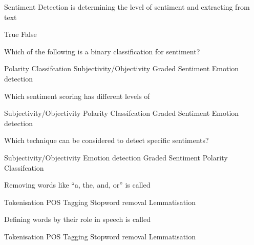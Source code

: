 \documentclass[theme=sleek, randomorder, hidesidemenu]{webquiz}
\begin{document}
\begin{question}
  Sentiment Detection is determining the level of sentiment and extracting from text
  \begin{choice}
    \incorrect True
    \correct False
  \end{choice}
\end{question}

\begin{question}
  Which of the following is a binary classification for sentiment?
  \begin{choice}
    \incorrect Polarity Classifcation
    \correct Subjectivity/Objectivity
    \incorrect Graded Sentiment
    \incorrect Emotion detection
  \end{choice}
\end{question}

\begin{question}
  Which sentiment scoring has different levels of
  \begin{choice}
    \incorrect Subjectivity/Objectivity
    \correct Polarity Classifcation
    \incorrect Graded Sentiment
    \incorrect Emotion detection
  \end{choice}
\end{question}

\begin{question}
  Which technique can be considered to detect specific sentiments?
  \begin{choice}
    \incorrect Subjectivity/Objectivity
    \correct Emotion detection
    \incorrect Graded Sentiment
    \incorrect Polarity Classifcation
  \end{choice}

\end{question}

\begin{question}
  Removing words like ``a, the, and, or'' is called
  \begin{choice}
    \incorrect Tokenisation
    \incorrect POS Tagging
    \correct Stopword removal
    \incorrect Lemmatisation
  \end{choice}
\end{question}

\begin{question}
  Defining words by their role in speech is called
  \begin{choice}
    \incorrect Tokenisation
    \correct POS Tagging
    \incorrect Stopword removal
    \incorrect Lemmatisation
  \end{choice}
\end{question}
\end{document}
